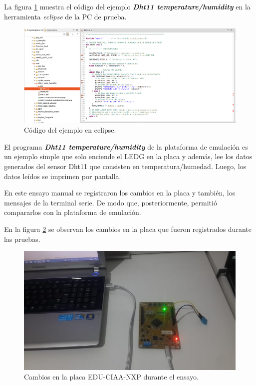 La figura \ref{fig:TestEclipse} muestra el código del ejemplo \textit{\textbf{Dht11 temperature/humidity}} en la herramienta \textit{eclipse} de la PC de prueba.

\begin{figure}[ht]
	\centering
	\includegraphics[scale=.22]{./Figures/TestEclipse.png}
	\caption{Código del ejemplo en eclipse.}
	\label{fig:TestEclipse}
\end{figure}

\hfill \break
\hfill \break
\hfill \break
\hfill \break

El programa \textit{\textbf{Dht11 temperature/humidity}} de la plataforma de emulación es un ejemplo simple que solo enciende el LEDG en la placa y además, lee los datos generados del sensor Dht11 que consisten en temperatura/humedad. Luego, los datos leídos se imprimen por pantalla. 

En este ensayo manual se registraron los cambios en la placa y también, los mensajes de la terminal serie. De modo que, posteriormente, permitió compararlos con la plataforma de emulación.

En la figura \ref{fig:TestPlaca} se observan los cambios en la placa que fueron registrados durante las pruebas.


\begin{figure}[ht]
	\centering
	\includegraphics[scale=.50]{./Figures/TestPlaca.jpeg}
	\caption{Cambios en la placa EDU-CIAA-NXP durante el ensayo.}
	\label{fig:TestPlaca}
\end{figure}


